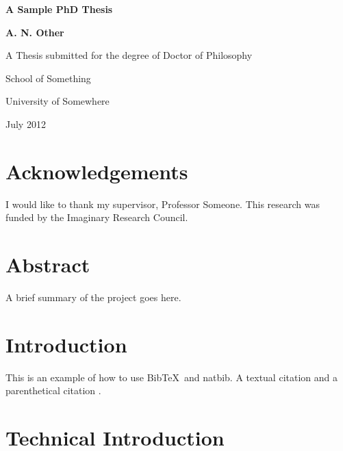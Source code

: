 \documentclass[oneside,12pt]{scrbook}
\theoremstyle{break}
\begin{document}
\begin{titlepage}
\centering
\vspace*{1in}
\begin{Large}\bfseries
A Sample PhD Thesis\par
\end{Large}
\vspace{1.5in}
\begin{large}\bfseries
A. N. Other\par
\end{large}
\vfill
A Thesis submitted for the degree of Doctor of Philosophy
\par
\vspace{0.5in}
School of Something
\par
University of Somewhere
\par
\vspace{0.5in}
July 2012
\par
\end{titlepage}

\doublespacing

\frontmatter
\tableofcontents
\listoffigures
\listoftables
\lstlistoflistings

\chapter{Acknowledgements}

I would like to thank my supervisor, Professor Someone. This
research was funded by the Imaginary Research Council.

\chapter{Abstract}

A brief summary of the project goes here.

\mainmatter

\chapter{Introduction}
\label{ch:intro}

This is an example of how to use Bib\TeX\ and natbib.
A textual citation \citet{turabian96} and a parenthetical citation
\citep[see][Chapter 9]{goossens97}. 

\chapter{Technical Introduction}
\label{ch:techintro}
\end{document}
